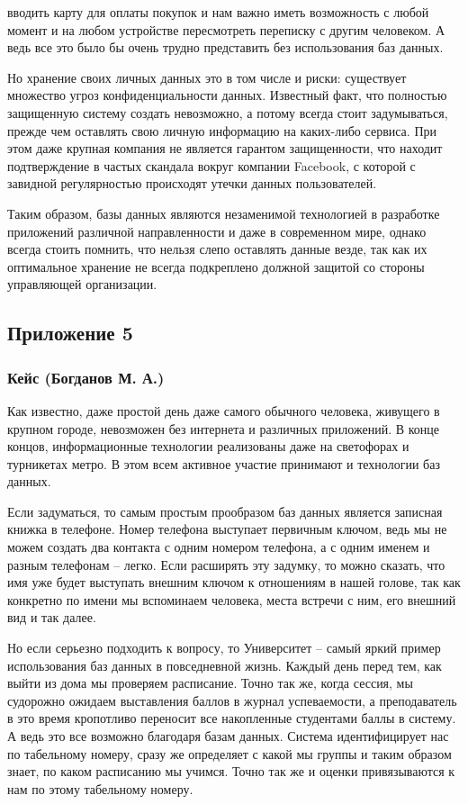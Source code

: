 \documentclass[a4paper,14pt]{extarticle}
\begin{document}
вводить карту для оплаты покупок и нам важно иметь возможность с любой момент и на любом устройстве пересмотреть переписку с другим человеком. А ведь все это было бы очень трудно представить без использования баз данных.

Но хранение своих личных данных это в том числе и риски: существует множество угроз конфиденциальности данных. Известный факт, что полностью защищенную систему создать невозможно, а потому всегда стоит задумываться, прежде чем оставлять свою личную информацию на каких-либо сервиса. При этом даже крупная компания не является гарантом защищенности, что находит подтверждение в частых скандала вокруг компании Facebook, с которой с завидной регулярностью происходят утечки данных пользователей.

Таким образом, базы данных являются незаменимой технологией в разработке приложений различной направленности и даже в современном мире, однако всегда стоить помнить, что нельзя слепо оставлять данные везде, так как их оптимальное хранение не всегда подкреплено должной защитой со стороны управляющей организации.

\newpage

\subsection*{\hfill Приложение 5}

\subsubsection*{\centering Кейс (Богданов М. А.)}

Как известно, даже простой день даже самого обычного человека, живущего в крупном городе, невозможен без интернета и различных приложений. В конце концов, информационные технологии реализованы даже на светофорах и турникетах метро. В этом всем активное участие принимают и технологии баз данных.

Если задуматься, то самым простым прообразом баз данных является записная книжка в телефоне. Номер телефона выступает первичным ключом, ведь мы не можем создать два контакта с одним номером телефона, а с одним именем и разным телефонам – легко. Если расширять эту задумку, то можно сказать, что имя уже будет выступать внешним ключом к отношениям в нашей голове, так как конкретно по имени мы вспоминаем человека, места встречи с ним, его внешний вид и так далее.

Но если серьезно подходить к вопросу, то Университет – самый яркий пример использования баз данных в повседневной жизнь. Каждый день перед тем, как выйти из дома мы проверяем расписание. Точно так же, когда сессия, мы судорожно ожидаем выставления баллов в журнал успеваемости, а преподаватель в это время кропотливо переносит все накопленные студентами баллы в систему. А ведь это все возможно благодаря базам данных. Система идентифицирует нас по табельному номеру, сразу же определяет с какой мы группы и таким образом знает, по каком расписанию мы учимся. Точно так же и оценки привязываются к нам по этому табельному номеру.
\end{document}
